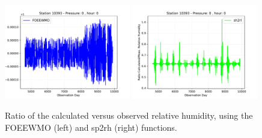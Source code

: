 \documentclass[a4paper,11pt]{article}
\begin{document}
\begin{figure}[!b]
	\centering
	\subfigure
	{ \includegraphics[width=0.49\textwidth]{Fig/ratios_FOEEWMO_0_0.pdf}}
	\subfigure
	{\includegraphics[width=0.49\textwidth]{Fig/ratios_sh2rl_0_0.pdf}}
	\caption{Ratio of the calculated versus observed relative humidity, using the FOEEWMO (left) and sp2rh (right) functions.}
	\label{ratio}
\end{figure}










%
%
\end{document}
